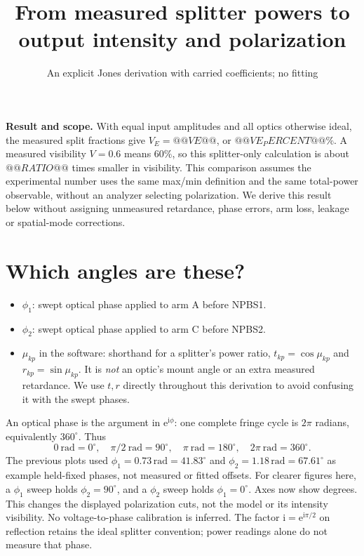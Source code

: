 \documentclass[11pt,a4paper]{article}
\title{From measured splitter powers to output intensity and polarization}
\author{An explicit Jones derivation with carried coefficients; no fitting}
\date{}
\newcommand{\ee}{\mathrm e}
\newcommand{\ii}{\mathrm i}
\begin{document}
\maketitle

\noindent\textbf{Result and scope.} With equal input amplitudes and all optics
otherwise ideal, the measured split fractions give $V_E=@@VE@@$,
or $@@VE_PERCENT@@\%$. A measured visibility $V=0.6$ means $60\%$, so this
splitter-only calculation is about $@@RATIO@@$ times smaller in visibility.
This comparison assumes the experimental number uses the same max/min definition
and the same total-power observable, without an analyzer selecting polarization.
We derive this result below without assigning unmeasured retardance, phase
errors, arm loss, leakage or spatial-mode corrections.

\section{Which angles are these?}
\begin{itemize}
\item $\phi_1$: swept optical phase applied to arm A before NPBS1.
\item $\phi_2$: swept optical phase applied to arm C before NPBS2.
\item $\mu_{kp}$ in the software: shorthand for a splitter's power ratio,
$t_{kp}=\cos\mu_{kp}$ and $r_{kp}=\sin\mu_{kp}$. It is \emph{not} an optic's
mount angle or an extra measured retardance. We use $t,r$ directly throughout
this derivation to avoid confusing it with the swept phases.
\end{itemize}
An optical phase is the argument in $\ee^{\ii\phi}$: one complete fringe cycle is
$2\pi$ radians, equivalently $360^\circ$. Thus
\[
0\ \mathrm{rad}=0^\circ,\quad \pi/2\ \mathrm{rad}=90^\circ,\quad
\pi\ \mathrm{rad}=180^\circ,\quad 2\pi\ \mathrm{rad}=360^\circ.
\]
The previous plots used $\phi_1=0.73\,\mathrm{rad}=41.83^\circ$ and
$\phi_2=1.18\,\mathrm{rad}=67.61^\circ$ as example held-fixed phases, not
measured or fitted offsets. For clearer figures here, a $\phi_1$ sweep holds
$\phi_2=90^\circ$, and a $\phi_2$ sweep holds $\phi_1=0^\circ$.
Axes now show degrees. This changes the displayed polarization cuts, not the
model or its intensity visibility. No voltage-to-phase calibration is inferred.
The factor $\ii=\ee^{\ii\pi/2}$ on reflection retains the ideal splitter
convention; power readings alone do not measure that phase.
\end{document}
